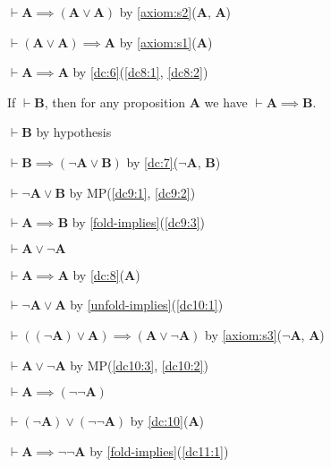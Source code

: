 \documentclass{amsart}%
\newcommand\metavariable[1]{\boldsymbol{#1}}
\begin{document}
\begin{pf}
\item\label{dc8:1} $\vdash\metavariable{A}\implies(\metavariable{A}\lor\metavariable{A})$
  by \ref{axiom:s2}($\metavariable{A}$, $\metavariable{A}$)
\item\label{dc8:2} $\vdash(\metavariable{A}\lor\metavariable{A})\implies\metavariable{A}$
  by \ref{axiom:s1}($\metavariable{A}$)
\item $\vdash\metavariable{A}\implies\metavariable{A}$ by
  \ref{dc:6}(\ref{dc8:1}, \ref{dc8:2})
\end{pf}

\begin{dc}\label{dc:9}
If $\vdash\metavariable{B}$, then for any proposition $\metavariable{A}$
we have $\vdash\metavariable{A}\implies\metavariable{B}$.
\end{dc}

\begin{pf}
\item\label{dc9:1} $\vdash\metavariable{B}$ by hypothesis
\item\label{dc9:2} $\vdash\metavariable{B}\implies(\neg\metavariable{A}\lor\metavariable{B})$
  by \ref{dc:7}($\neg{\metavariable{A}}$, $\metavariable{B}$)
\item\label{dc9:3} $\vdash\neg\metavariable{A}\lor\metavariable{B}$ by
  MP(\ref{dc9:1}, \ref{dc9:2})
\item $\vdash\metavariable{A}\implies\metavariable{B}$ by \ref{fold-implies}(\ref{dc9:3})
\end{pf}

\begin{dc}\label{dc:10}
$\vdash\metavariable{A}\lor\neg\metavariable{A}$
\end{dc}
\begin{pf}
\item\label{dc10:1} $\vdash\metavariable{A}\implies\metavariable{A}$
  by \ref{dc:8}($\metavariable{A}$)
\item\label{dc10:2} $\vdash\neg\metavariable{A}\lor\metavariable{A}$
  by \ref{unfold-implies}(\ref{dc10:1})
\item\label{dc10:3} $\vdash((\neg\metavariable{A})\lor\metavariable{A})\implies(\metavariable{A}\lor\neg\metavariable{A})$
  by \ref{axiom:s3}($\neg\metavariable{A}$, $\metavariable{A}$)
\item $\vdash\metavariable{A}\lor\neg\metavariable{A}$ by
  MP(\ref{dc10:3}, \ref{dc10:2})
\end{pf}

\begin{dc}\label{dc:11}
$\vdash\metavariable{A}\implies(\neg\neg\metavariable{A})$
\end{dc}
\begin{pf}
\item\label{dc11:1} $\vdash(\neg\metavariable{A})\lor(\neg\neg\metavariable{A})$
  by \ref{dc:10}($\metavariable{A}$)
\item $\vdash\metavariable{A}\implies\neg\neg\metavariable{A}$
  by \ref{fold-implies}(\ref{dc11:1})
\end{pf}
\end{document}
